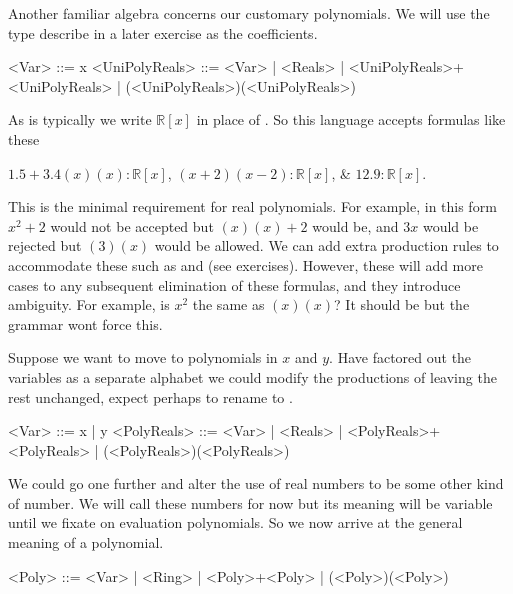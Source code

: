 Another familiar algebra concerns our customary polynomials.  We will use 
the type  describe in a later exercise as the coefficients.
\begin{Gcode}[]
    <Var>  ::= x 
    <UniPolyReals> ::= <Var>
            | <Reals>
            | <UniPolyReals>+<UniPolyReals>
            | (<UniPolyReals>)(<UniPolyReals>)
\end{Gcode}
As is typically  we write $\mathbb{R}[x]$ in place 
of .  So this language accepts formulas like these 
\begin{center}
    $1.5+3.4(x)(x):\mathbb{R}[x]$,
    $(x+2)(x-2):\mathbb{R}[x]$, \&
    $12.9:\mathbb{R}[x]$.
\end{center}
This is the minimal requirement for real polynomials.
For example, in this form $x^2+2$ would not be accepted but 
$(x)(x)+2$ would be, and $3x$ would be rejected but $(3)(x)$ would 
be allowed.  We can add extra production rules to accommodate these 
such as  and  (see exercises).  However, 
these will add more cases to any subsequent elimination of these formulas,
and they introduce ambiguity.  For example, is $x^2$ the same as $(x)(x)$?
It should be but the grammar wont force this.



Suppose we want to move to polynomials in $x$ and $y$.  Have factored out 
the variables as a separate alphabet we could modify the productions of 
 leaving the rest unchanged, expect perhaps to rename 
 to .
\begin{Gcode}[]
    <Var>  ::= x | y
    <PolyReals> ::= <Var>
            | <Reals>
            | <PolyReals>+<PolyReals>
            | (<PolyReals>)(<PolyReals>)
\end{Gcode}
We could go one further and alter the use of real numbers to be some other 
kind  of number.  We will call these numbers  for now but its 
meaning will be variable until we fixate on evaluation polynomials.
So we now arrive at the general meaning of a polynomial.
\begin{Gcode}[]
    <Poly> ::= <Var>
            | <Ring>
            | <Poly>+<Poly>
            | (<Poly>)(<Poly>)
\end{Gcode}



